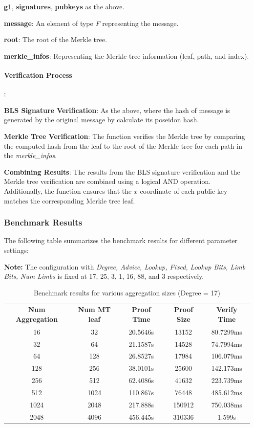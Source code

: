 \documentclass{article}
\begin{document}
\textbf{g1}, \textbf{signatures}, \textbf{pubkeys} as the above.

\textbf{message}: An element of type \textit{F} representing the message.

\textbf{root}: The root of the Merkle tree.

\textbf{merkle\_infos}: Representing the Merkle tree information (leaf, path, and index).

\paragraph{Verification Process}
:
    
\textbf{BLS Signature Verification}: 
    As the above, where the hash of message is generated by the original message by calculate its poseidon hash.

\textbf{Merkle Tree Verification}:
    The function verifies the Merkle tree by comparing the computed hash from the leaf to the root of the Merkle tree for each path in the \textit{merkle\_infos}. 

\textbf{Combining Results}:
    The results from the BLS signature verification and the Merkle tree verification are combined using a logical AND operation. Additionally, the function ensures that the $x$ coordinate of each public key matches the corresponding Merkle tree leaf.



\subsubsection{Benchmark Results}
The following table summarizes the benchmark results for different parameter settings:

\textbf{Note:} The configuration with \textit{Degree, Advice, Lookup, Fixed, Lookup Bits, Limb Bits, Num Limbs} is fixed at 17, 25, 3, 1, 16, 88, and 3 respectively.

\begin{table}[h]
    \centering
    \begin{tabular}{c|c|c|c|c} \hline
        Num Aggregation & Num MT leaf & Proof Time & Proof Size & Verify Time \\ \hline
        16 & 32 & 20.5646s & 13152 & 80.7299ms \\ \hline
        32 & 64 & 21.1587s & 14528 & 74.7994ms \\ \hline
        64 & 128 & 26.8527s & 17984 & 106.079ms \\ \hline
        128 & 256 & 38.0101s & 25600 & 142.173ms \\ \hline
        256 & 512 & 62.4086s & 41632 & 223.739ms \\ \hline
        512 & 1024 & 110.867s & 76448 & 485.612ms \\ \hline
        1024 & 2048 & 217.888s & 150912 & 750.038ms \\ \hline
        2048 & 4096 & 456.445s & 310336 & 1.599s \\ \hline
    \end{tabular}
    \caption{Benchmark results for various aggregation sizes (Degree = 17)}
    \label{tab:degree17}
\end{table}
\end{document}
